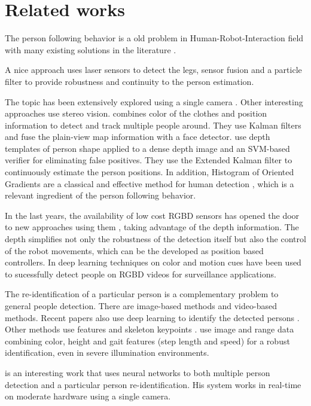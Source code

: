 \section{Related works}

The person following behavior is a old problem in Human-Robot-Interaction field with many existing solutions in the literature \cite{sidenbladh1999person,rocapal2005,yoshimi2006development}. 

A nice approach \cite{aguirre2016multisensor} uses laser sensors to detect the legs, sensor fusion and a particle filter to provide robustness and continuity to the person estimation. 

The topic has been extensively explored using a single camera \cite{yoshimi2006development}. Other interesting approaches use stereo vision. \cite{munoz2007people} combines color of the clothes and position information to detect and track multiple people around. They use Kalman filters and fuse the plain-view map information with a face detector. \cite{satake2009robust} use depth templates of person shape applied to a dense depth image and an SVM-based verifier for eliminating false positives. They use the Extended Kalman filter to continuously estimate the person positions. In addition, Histogram of Oriented Gradients are a classical and effective method for human detection \cite{dalal2005}, which is a relevant ingredient of the person following behavior.

In the last years, the availability of low cost RGBD sensors has opened the door to new approaches using them \cite{ilias2014nurse,shimura2014research}, taking advantage of the depth information. The depth simplifies not only the robustness of the detection itself but also the control of the robot movements, which can be the developed as position based controllers. In \cite{xue2016tracking} deep learning techniques on color and motion cues have been used to sucessfully detect people on RGBD videos for surveillance applications.

The re-identification of a particular person is a complementary problem to general people detection. There are image-based methods and video-based methods. Recent papers also use deep learning to identify the detected persons \cite{yoon2016person}. Other methods use features and skeleton keypoints \cite{munaro2014feature}. \cite{koide2016identification} use image and range data combining color, height and gait features (step length and speed) for a robust identification, even in severe illumination environments.

\cite{welsh2017real} is an interesting work that uses neural networks to both multiple person detection and a particular person re-identification. His system works in real-time on moderate hardware using a single camera. 

